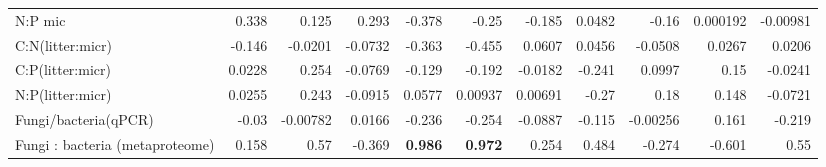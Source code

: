 \documentclass[10pt]{article}
\begin{document}
\begin{flushleft}
\begin{landscape}
\begin{table}[h!]
{\begin{tabular}{lrrrrrrrrrr}
  N:P mic & 0.338 & 0.125 & 0.293 & -0.378 & -0.25 & -0.185 & 0.0482 & -0.16 & 0.000192 & -0.00981 \\ 
  C:N(litter:micr) & -0.146 & -0.0201 & -0.0732 & -0.363 & -0.455 & 0.0607 & 0.0456 & -0.0508 & 0.0267 & 0.0206 \\ 
  C:P(litter:micr) & 0.0228 & 0.254 & -0.0769 & -0.129 & -0.192 & -0.0182 & -0.241 & 0.0997 & 0.15 & -0.0241 \\ 
  N:P(litter:micr) & 0.0255 & 0.243 & -0.0915 & 0.0577 & 0.00937 & 0.00691 & -0.27 & 0.18 & 0.148 & -0.0721 \\ 
  Fungi/bacteria(qPCR) & -0.03 & -0.00782 & 0.0166 & -0.236 & -0.254 & -0.0887 & -0.115 & -0.00256 & 0.161 & -0.219 \\ 
  Fungi : bacteria (metaproteome) & 0.158 & 0.57 & -0.369 & \textbf{ 0.986 } & \textbf{ 0.972 } & 0.254 & 0.484 & -0.274 & -0.601 & 0.55 \\ 
   \hline
\end{tabular}
}
\end{table}\end{landscape}




\end{flushleft}
\end{document}
